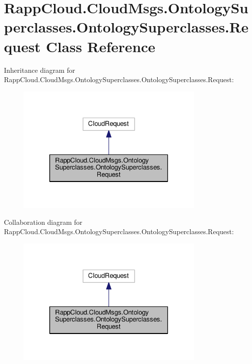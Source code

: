 \hypertarget{classRappCloud_1_1CloudMsgs_1_1OntologySuperclasses_1_1OntologySuperclasses_1_1Request}{\section{Rapp\-Cloud.\-Cloud\-Msgs.\-Ontology\-Superclasses.\-Ontology\-Superclasses.\-Request Class Reference}
\label{classRappCloud_1_1CloudMsgs_1_1OntologySuperclasses_1_1OntologySuperclasses_1_1Request}
}


Inheritance diagram for Rapp\-Cloud.\-Cloud\-Msgs.\-Ontology\-Superclasses.\-Ontology\-Superclasses.\-Request\-:
\nopagebreak
\begin{figure}[H]
\begin{center}
\leavevmode
\includegraphics[width=260pt]{classRappCloud_1_1CloudMsgs_1_1OntologySuperclasses_1_1OntologySuperclasses_1_1Request__inherit__graph}
\end{center}
\end{figure}


Collaboration diagram for Rapp\-Cloud.\-Cloud\-Msgs.\-Ontology\-Superclasses.\-Ontology\-Superclasses.\-Request\-:
\nopagebreak
\begin{figure}[H]
\begin{center}
\leavevmode
\includegraphics[width=260pt]{classRappCloud_1_1CloudMsgs_1_1OntologySuperclasses_1_1OntologySuperclasses_1_1Request__coll__graph}
\end{center}
\end{figure}
